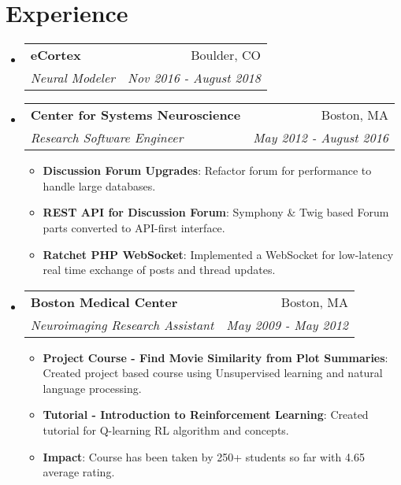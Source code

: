 \documentclass[a4paper,20pt]{article}
\makeatletter
\newcommand{\resumeItem}[2]{
  \item\small{
    \textbf{#1}{: #2 \vspace{-2pt}}
  }
}
\newcommand{\resumeSubheading}[4]{
  \vspace{-1pt}\item
    \begin{tabular*}{0.97\textwidth}{l@{\extracolsep{\fill}}r}
      \textbf{#1} & #2 \\
      \textit{#3} & \textit{#4} \\
    \end{tabular*}\vspace{-5pt}
}
\newcommand{\resumeSubHeadingListStart}{\begin{itemize}[leftmargin=*]}
\newcommand{\resumeSubHeadingListEnd}{\end{itemize}}
\newcommand{\resumeItemListStart}{\begin{itemize}}
\newcommand{\resumeItemListEnd}{\end{itemize}\vspace{-5pt}}
\makeatother
\begin{document}
\vspace{-5pt}
\section{Experience}
  \resumeSubHeadingListStart
    \resumeSubheading{eCortex}{Boulder, CO}
    {Neural Modeler}{Nov 2016 - August 2018}
    \resumeSubheading{Center for Systems Neuroscience}{Boston, MA}
    {Research Software Engineer}{May 2012 - August 2016}
    \resumeItemListStart
        \resumeItem{Discussion Forum Upgrades}
          {Refactor forum for performance to handle large databases.}
          \resumeItem{REST API for Discussion Forum}
          {Symphony \& Twig based Forum parts converted to API-first interface.}
          \resumeItem{Ratchet PHP WebSocket}{Implemented a WebSocket for low-latency real time exchange of posts and thread updates.}
      \resumeItemListEnd
\vspace{-5pt}
    \resumeSubheading
		{Boston Medical Center}{Boston, MA}
		{Neuroimaging Research Assistant}{May 2009 -  May 2012}
		\resumeItemListStart
        \resumeItem{Project Course - Find Movie Similarity from Plot Summaries}
          {Created project based course using Unsupervised learning and natural language processing.}
        \resumeItem{Tutorial - Introduction to Reinforcement Learning}
          {Created tutorial for Q-learning RL algorithm and  concepts.}
        \resumeItem{Impact}{Course has been taken by 250+ students so far with 4.65 average rating.}
		\resumeItemListEnd

\resumeSubHeadingListEnd

\vspace{-5pt}
\end{document}
